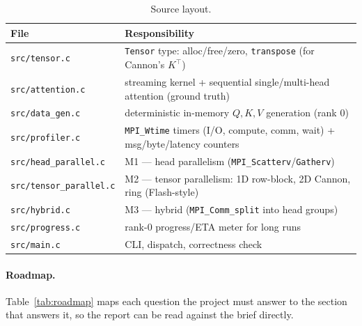 \documentclass[11pt,a4paper]{article}
\newcommand{\code}[1]{\texttt{#1}}
\begin{document}
\begin{table}[H]
\centering\small
\caption{Source layout.}\label{tab:files}
\begin{tabular}{@{}ll@{}}
\toprule
File & Responsibility \\
\midrule
\code{src/tensor.c}          & \code{Tensor} type: alloc/free/zero, \code{transpose} (for Cannon's $K^{\top}$) \\
\code{src/attention.c}       & streaming kernel + sequential single/multi-head attention (ground truth) \\
\code{src/data\_gen.c}       & deterministic in-memory $Q,K,V$ generation (rank 0) \\
\code{src/profiler.c}        & \code{MPI\_Wtime} timers (I/O, compute, comm, wait) + msg/byte/latency counters \\
\code{src/head\_parallel.c}  & M1 --- head parallelism (\code{MPI\_Scatterv}/\code{Gatherv}) \\
\code{src/tensor\_parallel.c}& M2 --- tensor parallelism: 1D row-block, 2D Cannon, ring (Flash-style) \\
\code{src/hybrid.c}          & M3 --- hybrid (\code{MPI\_Comm\_split} into head groups) \\
\code{src/progress.c}        & rank-0 progress/ETA meter for long runs \\
\code{src/main.c}            & CLI, dispatch, correctness check \\
\bottomrule
\end{tabular}
\end{table}

\paragraph{Roadmap.} Table~\ref{tab:roadmap} maps each question the project must
answer to the section that answers it, so the report can be read against the brief
directly.
\end{document}
